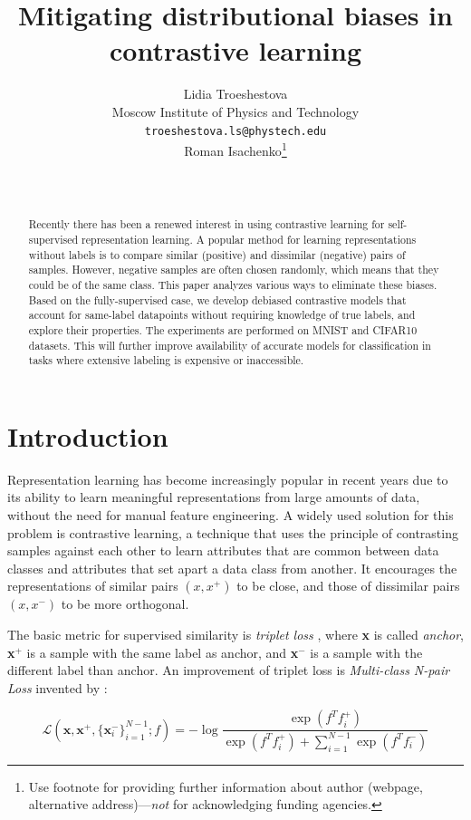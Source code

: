 \documentclass{article}
\title{Mitigating distributional biases in contrastive learning}
\author{ Lidia Troeshestova \\
	Moscow Institute of Physics and Technology\\
	\texttt{troeshestova.ls@phystech.edu} \\
	\And
	Roman Isachenko\thanks{Use footnote for providing further information about author (webpage, alternative address)---\emph{not} for acknowledging funding agencies.} \\
	   \\
	\texttt{} \\
}
\date{}
\begin{document}
\maketitle

\begin{abstract}
	Recently there has been a renewed interest in using contrastive learning for self-supervised representation learning. A popular method for learning representations without labels is to compare similar (positive) and dissimilar (negative) pairs of samples. However, negative samples are often chosen randomly, which means that they could be of the same class. This paper analyzes various ways to eliminate these biases. Based on the fully-supervised case, we develop debiased contrastive models that account for same-label datapoints without requiring knowledge of true labels, and explore their properties. The experiments are performed on MNIST and CIFAR10 datasets. This will further improve availability of accurate models for classification in tasks where extensive labeling is expensive or inaccessible.
\end{abstract}



\section{Introduction}
Representation learning has become increasingly popular in recent years due to its ability to learn meaningful representations from large amounts of data, without the need for manual feature engineering. A widely used solution for this problem is contrastive learning, a technique that uses the principle of contrasting samples against each other to learn attributes that are common between data classes and attributes that set apart a data class from another. It encourages the representations of similar pairs $(x, x^+)$ to be close, and those of dissimilar pairs $(x, x^-)$ to be more orthogonal.

The basic metric for supervised similarity is \textit{triplet loss} \citep{schroff2015facenet}, where \textbf{x} is called \textit{anchor}, \textbf{x}$^+$ is a sample with the same label as anchor, and \textbf{x}$^-$ is a sample with the different label than anchor. An improvement of triplet loss is \textit{Multi-class N-pair Loss} invented by \citep{NIPS2016_6b180037}:

\begin{equation} \label{eq:1}
\mathcal{L}(\textbf{x}, \textbf{x}^+, \{\textbf{x}_i^-\}_{i=1}^{N-1}; f) = - \log \frac{\exp(f^T f_i^+)}{\exp(f^T f_i^+) + \sum _{i=1}^{N-1} \exp(f^Tf_i^-)}
\end{equation}
\end{document}
